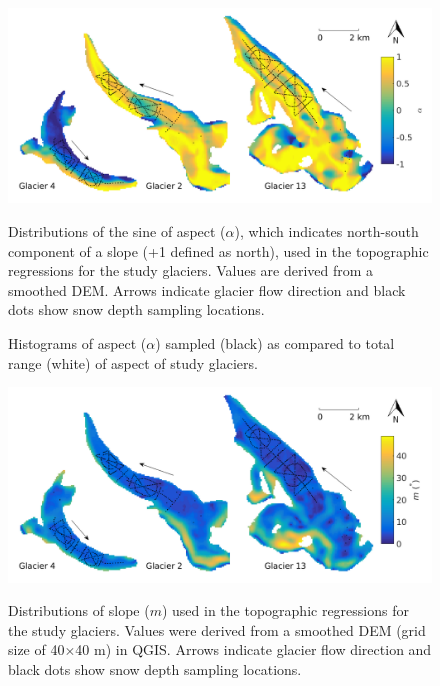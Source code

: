 \documentclass{sfuthesis}
\newcommand{\topomap}{Arrows indicate glacier flow direction and black dots show snow depth sampling locations. }
\begin{document}
\begin{figure}
	\centering
	\includegraphics[width=\textwidth]{Map_aspect.png}\\
	\caption{Distributions of the sine of aspect ($\alpha$), which indicates north-south component of a slope (+1 defined as north), used in the topographic regressions for the study glaciers. Values are derived from a smoothed DEM. \topomap}
	\label{map:aspect}
\end{figure}

\begin{figure}
	\caption{Histograms of aspect ($\alpha$) sampled (black) as compared to total range (white) of aspect of study glaciers.}
	\label{sampledRange:aspect}
\end{figure}

\begin{figure}
	\centering
	\includegraphics[width=\textwidth]{Map_slope.png}\\
	\caption{Distributions of slope ($m$) used in the topographic regressions for the study glaciers. Values were derived from a smoothed DEM (grid size of 40$\times$40 m) in QGIS. \topomap}
	\label{map:slope}
\end{figure}
\end{document}
